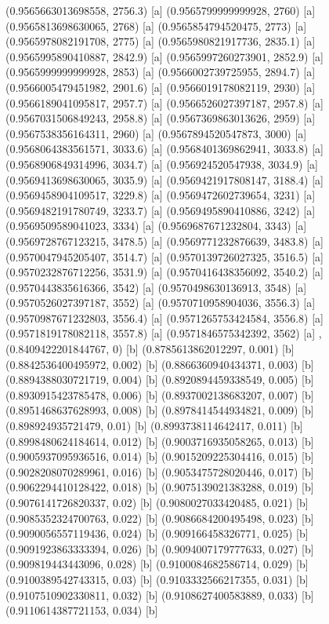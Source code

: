 {{{(0.9565663013698558, 2756.3) [a] 
(0.9565799999999928, 2760) [a] 
(0.9565813698630065, 2768) [a] 
(0.9565854794520475, 2773) [a] 
(0.9565978082191708, 2775) [a] 
(0.9565980821917736, 2835.1) [a] 
(0.9565995890410887, 2842.9) [a] 
(0.9565997260273901, 2852.9) [a] 
(0.9565999999999928, 2853) [a] 
(0.9566002739725955, 2894.7) [a] 
(0.9566005479451982, 2901.6) [a] 
(0.9566019178082119, 2930) [a] 
(0.9566189041095817, 2957.7) [a] 
(0.9566526027397187, 2957.8) [a] 
(0.9567031506849243, 2958.8) [a] 
(0.9567369863013626, 2959) [a] 
(0.9567538356164311, 2960) [a] 
(0.9567894520547873, 3000) [a] 
(0.9568064383561571, 3033.6) [a] 
(0.9568401369862941, 3033.8) [a] 
(0.9568906849314996, 3034.7) [a] 
(0.956924520547938, 3034.9) [a] 
(0.9569413698630065, 3035.9) [a] 
(0.9569421917808147, 3188.4) [a] 
(0.9569458904109517, 3229.8) [a] 
(0.9569472602739654, 3231) [a] 
(0.9569482191780749, 3233.7) [a] 
(0.9569495890410886, 3242) [a] 
(0.9569509589041023, 3334) [a] 
(0.9569687671232804, 3343) [a] 
(0.9569728767123215, 3478.5) [a] 
(0.9569771232876639, 3483.8) [a] 
(0.9570047945205407, 3514.7) [a] 
(0.9570139726027325, 3516.5) [a] 
(0.9570232876712256, 3531.9) [a] 
(0.9570416438356092, 3540.2) [a] 
(0.9570443835616366, 3542) [a] 
(0.9570498630136913, 3548) [a] 
(0.9570526027397187, 3552) [a] 
(0.9570710958904036, 3556.3) [a] 
(0.9570987671232803, 3556.4) [a] 
(0.9571265753424584, 3556.8) [a] 
(0.9571819178082118, 3557.8) [a] 
(0.9571846575342392, 3562) [a] 
},{(0.8409422201844767, 0) [b] 
(0.8785613862012297, 0.001) [b] 
(0.8842536400495972, 0.002) [b] 
(0.8866360940434371, 0.003) [b] 
(0.8894388030721719, 0.004) [b] 
(0.8920894459338549, 0.005) [b] 
(0.8930915423785478, 0.006) [b] 
(0.8937002138683207, 0.007) [b] 
(0.8951468637628993, 0.008) [b] 
(0.8978414544934821, 0.009) [b] 
(0.898924935721479, 0.01) [b] 
(0.8993738114642417, 0.011) [b] 
(0.8998480624184614, 0.012) [b] 
(0.9003716935058265, 0.013) [b] 
(0.9005937095936516, 0.014) [b] 
(0.9015209225304416, 0.015) [b] 
(0.9028208070289961, 0.016) [b] 
(0.9053475728020446, 0.017) [b] 
(0.9062294410128422, 0.018) [b] 
(0.9075139021383288, 0.019) [b] 
(0.9076141726820337, 0.02) [b] 
(0.9080027033420485, 0.021) [b] 
(0.9085352324700763, 0.022) [b] 
(0.9086684200495498, 0.023) [b] 
(0.9090056557119436, 0.024) [b] 
(0.909166458326771, 0.025) [b] 
(0.9091923863333394, 0.026) [b] 
(0.9094007179777633, 0.027) [b] 
(0.909819443443096, 0.028) [b] 
(0.9100084682586714, 0.029) [b] 
(0.9100389542743315, 0.03) [b] 
(0.9103332566217355, 0.031) [b] 
(0.9107510902330811, 0.032) [b] 
(0.9108627400583889, 0.033) [b] 
(0.9110614387721153, 0.034) [b] 
}}}
